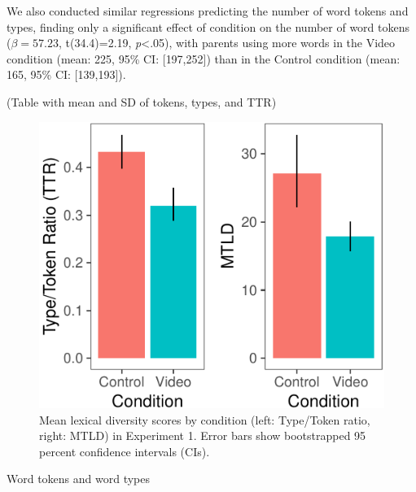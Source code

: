 \documentclass[10pt, letterpaper]{article}
\newenvironment{CodeChunk}{}{}
\begin{document}
We also conducted similar regressions predicting the number of word
tokens and types, finding only a significant effect of condition on the
number of word tokens (\(\beta=57.23\), t(34.4)=2.19,
\emph{p}\textless{}.05), with parents using more words in the Video
condition (mean: 225, 95\% CI: {[}197,252{]}) than in the Control
condition (mean: 165, 95\% CI: {[}139,193{]}).

(Table with mean and SD of tokens, types, and TTR)

\begin{CodeChunk}
\begin{figure}[H]

{\centering \includegraphics{figs/e1lex_div-1} 

}

\caption[Mean lexical diversity scores by condition (left]{Mean lexical diversity scores by condition (left: Type/Token ratio, right: MTLD) in Experiment 1. Error bars show bootstrapped 95 percent confidence intervals (CIs).}\label{fig:e1lex_div}
\end{figure}
\end{CodeChunk}

Word tokens and word types
\end{document}
